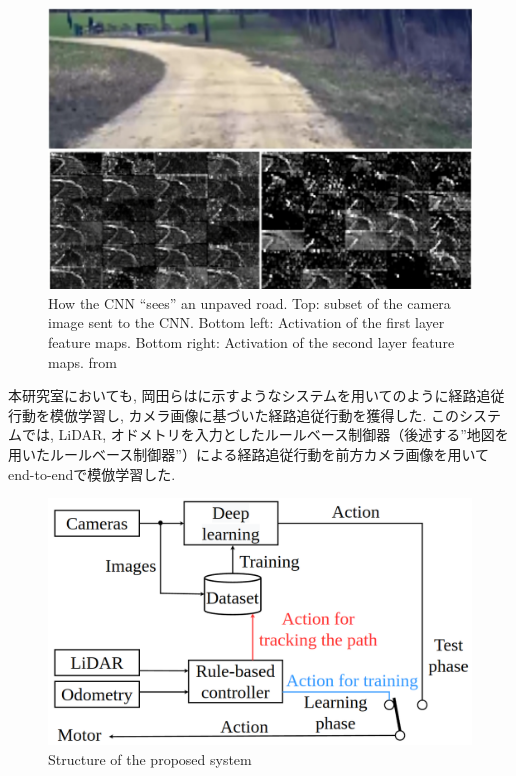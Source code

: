 \begin{figure}[hbtp]
     \centering
    \includegraphics[keepaspectratio, scale=0.3]
         {images/bojarski_viz.png}
    \caption{How the CNN “sees” an unpaved road. Top: subset of the camera image sent to the CNN.
    Bottom left: Activation of the first layer feature maps. Bottom right: Activation of the second layer
    feature maps.  from \cite{bojarski}}
    \label{Fig:bojarski_viz}
\end{figure}


\newpage

本研究室においても, 岡田ら\cite{okada1}\cite{okada2}はに示すようなシステムを用いてのように経路追従行動を模倣学習し, カメラ画像に基づいた経路追従行動を獲得した. このシステムでは, LiDAR, オドメトリを入力としたルールベース制御器（後述する”地図を用いたルールベース制御器”）による経路追従行動を前方カメラ画像を用いてend-to-endで模倣学習した. 

\vspace{1cm}

\begin{figure}[hbtp]
     \centering
     \includegraphics[keepaspectratio, scale=0.3]
          {images/okada_structure2.png}
     \caption{Structure of the proposed system}
     \label{Fig:okada_structure}
\end{figure}

